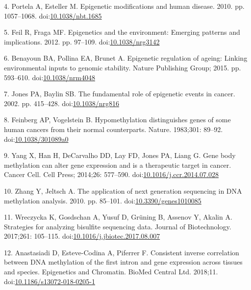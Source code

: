\documentclass[10pt,letterpaper]{article}
\begin{document}
\leavevmode\hypertarget{ref-Portela2010}{}%
4. Portela A, Esteller M. Epigenetic modifications and human disease.
2010. pp. 1057--1068.
doi:\href{https://doi.org/10.1038/nbt.1685}{10.1038/nbt.1685}

\leavevmode\hypertarget{ref-Feil2012}{}%
5. Feil R, Fraga MF. Epigenetics and the environment: Emerging patterns
and implications. 2012. pp. 97--109.
doi:\href{https://doi.org/10.1038/nrg3142}{10.1038/nrg3142}

\leavevmode\hypertarget{ref-Benayoun2015}{}%
6. Benayoun BA, Pollina EA, Brunet A. Epigenetic regulation of ageing:
Linking environmental inputs to genomic stability. Nature Publishing
Group; 2015. pp. 593--610.
doi:\href{https://doi.org/10.1038/nrm4048}{10.1038/nrm4048}

\leavevmode\hypertarget{ref-Jones2002}{}%
7. Jones PA, Baylin SB. The fundamental role of epigenetic events in
cancer. 2002. pp. 415--428.
doi:\href{https://doi.org/10.1038/nrg816}{10.1038/nrg816}

\leavevmode\hypertarget{ref-Feinberg1983}{}%
8. Feinberg AP, Vogelstein B. Hypomethylation distinguishes genes of
some human cancers from their normal counterparts. Nature. 1983;301:
89--92. doi:\href{https://doi.org/10.1038/301089a0}{10.1038/301089a0}

\leavevmode\hypertarget{ref-Yang2014}{}%
9. Yang X, Han H, DeCarvalho DD, Lay FD, Jones PA, Liang G. Gene body
methylation can alter gene expression and is a therapeutic target in
cancer. Cancer Cell. Cell Press; 2014;26: 577--590.
doi:\href{https://doi.org/10.1016/j.ccr.2014.07.028}{10.1016/j.ccr.2014.07.028}

\leavevmode\hypertarget{ref-Zhang2010}{}%
10. Zhang Y, Jeltsch A. The application of next generation sequencing in
DNA methylation analysis. 2010. pp. 85--101.
doi:\href{https://doi.org/10.3390/genes1010085}{10.3390/genes1010085}

\leavevmode\hypertarget{ref-Wreczycka2017}{}%
11. Wreczycka K, Gosdschan A, Yusuf D, Grüning B, Assenov Y, Akalin A.
Strategies for analyzing bisulfite sequencing data. Journal of
Biotechnology. 2017;261: 105--115.
doi:\href{https://doi.org/10.1016/j.jbiotec.2017.08.007}{10.1016/j.jbiotec.2017.08.007}

\leavevmode\hypertarget{ref-Anastasiadi2018}{}%
12. Anastasiadi D, Esteve-Codina A, Piferrer F. Consistent inverse
correlation between DNA methylation of the first intron and gene
expression across tissues and species. Epigenetics and Chromatin. BioMed
Central Ltd. 2018;11.
doi:\href{https://doi.org/10.1186/s13072-018-0205-1}{10.1186/s13072-018-0205-1}
\end{document}
